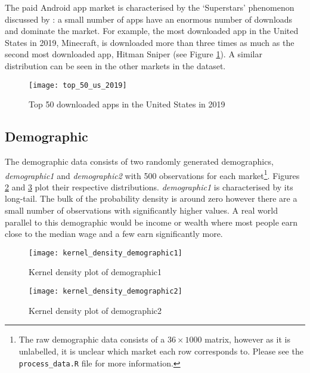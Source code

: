 \documentclass[parskip=half]{scrartcl}
\newcommand{\code}[1]{\texttt{#1}}
\begin{document}


The paid Android app market is characterised by the `Superstars' phenomenon discussed by \cite{rosen1981economics}: a small number of apps have an enormous number of downloads and dominate the market. For example, the most downloaded app in the United States in 2019, Minecraft, is downloaded more than three times as much as the second most downloaded app, Hitman Sniper (see Figure \ref{fig:top_50_us_2019}). A similar distribution can be seen in the other markets in the dataset.

\begin{figure}[ht]
	\centering
	\texttt{[image: top\_50\_us\_2019]}
	\caption{Top 50 downloaded apps in the United States in 2019}
	\label{fig:top_50_us_2019}
\end{figure}

\subsection{Demographic}

The demographic data consists of two randomly generated demographics, \emph{demographic1} and \emph{demographic2} with 500 observations for each market\footnote{The raw demographic data consists of a \(36\times1000\) matrix, however as it is unlabelled, it is unclear which market each row corresponds to. Please see the \code{process\_data.R} file for more information.}. Figures \ref{fig:density_demographic_1} and \ref{fig:density_demographic_2} plot their respective distributions.
\emph{demographic1} is characterised by its long-tail. The bulk of the probability density is around zero however there are a small number of observations with significantly higher values. A real world parallel to this demographic would be income or wealth where most people earn close to the median wage and a few earn significantly more.

\begin{figure}[ht]
	\centering
	\texttt{[image: kernel\_density\_demographic1]}
	\caption{Kernel density plot of demographic1}
	\label{fig:density_demographic_1}
\end{figure}

\begin{figure}[ht]
	\centering
	\texttt{[image: kernel\_density\_demographic2]}
	\caption{Kernel density plot of demographic2}
	\label{fig:density_demographic_2}
\end{figure}
\end{document}
